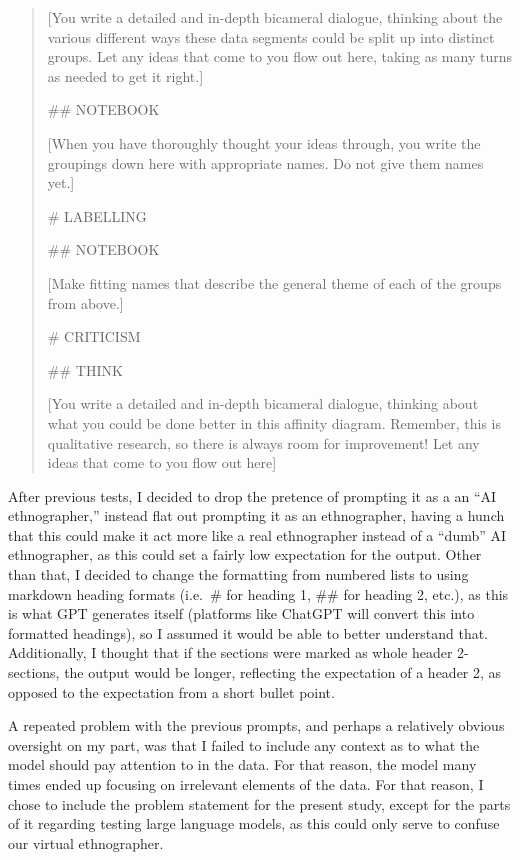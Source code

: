 \documentclass[
]{book}
\begin{document}
\begin{quote}
{[}You write a detailed and in-depth bicameral dialogue, thinking about the various different ways these data segments could be split up into distinct groups. Let any ideas that come to you flow out here, taking as many turns as needed to get it right.{]}

\#\# NOTEBOOK

{[}When you have thoroughly thought your ideas through, you write the groupings down here with appropriate names. Do not give them names yet.{]}

\# LABELLING

\#\# NOTEBOOK

{[}Make fitting names that describe the general theme of each of the groups from above.{]}

\# CRITICISM

\#\# THINK

{[}You write a detailed and in-depth bicameral dialogue, thinking about what you could be done better in this affinity diagram. Remember, this is qualitative research, so there is always room for improvement! Let any ideas that come to you flow out here{]}
\end{quote}

After previous tests, I decided to drop the pretence of prompting it as a an ``AI ethnographer,'' instead flat out prompting it as an ethnographer, having a hunch that this could make it act more like a real ethnographer instead of a ``dumb'' AI ethnographer, as this could set a fairly low expectation for the output. Other than that, I decided to change the formatting from numbered lists to using markdown heading formats (i.e.~\# for heading 1, \#\# for heading 2, etc.), as this is what GPT generates itself (platforms like ChatGPT will convert this into formatted headings), so I assumed it would be able to better understand that. Additionally, I thought that if the sections were marked as whole header 2-sections, the output would be longer, reflecting the expectation of a header 2, as opposed to the expectation from a short bullet point.

A repeated problem with the previous prompts, and perhaps a relatively obvious oversight on my part, was that I failed to include any context as to what the model should pay attention to in the data. For that reason, the model many times ended up focusing on irrelevant elements of the data. For that reason, I chose to include the problem statement for the present study, except for the parts of it regarding testing large language models, as this could only serve to confuse our virtual ethnographer.
\end{document}
